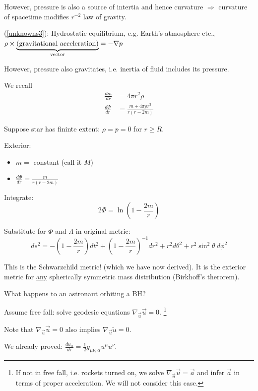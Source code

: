 \documentclass[a4paper]{article} %
\renewcommand{\tilde}{\widetilde}
\begin{document}
However, pressure is also a source of intertia and hence curvature $\Rightarrow$ curvature of spacetime modifies $r^{-2}$ law of gravity.

\HRule

(\ref{unknowns3}): Hydrostatic equilibrium, e.g. Earth's atmosphere etc., $\rho\times\underbrace{\text{(gravitational acceleration)}}_{\mathclap{\text{vector}}}=-\nabla p$

However, pressure also gravitates, i.e. inertia of fluid includes its pressure.

\HRule

We recall 
\begin{align}
\frac{dm}{dr}&=4\pi r^2 \rho\\
\frac{d\Phi}{dr}&=\frac{m+4\pi \rho r^3}{r(r-2m)}
\end{align}

Suppose star has fininte extent: $\rho=p=0$ for $r\geq R$.

Exterior: 
\begin{itemize}
\item $m=$ constant (call it $M$)
\item $\frac{d\Phi}{dr}=\frac{m}{r(r-2m)}$
\end{itemize}

Integrate:
\begin{equation}
2\Phi=\ln \left(1-\frac{2m}{r}\right)
\end{equation}

Substitute for $\Phi$ and $\Lambda$ in original metric:
\begin{equation}
ds^2=-\left(1-\frac{2m}{r}\right)dt^2+\left(1-\frac{2m}{r}\right)^{-1}dr^2 + r^2 d\theta^2
+r^2\sin^2 \theta~d\phi^2
\end{equation}

This is the Schwarzchild metric! (which we have now derived). It is the exterior metric for \underline{any} spherically symmetric mass distribution (Birkhoff's therorem).

What happens to an astronaut orbiting a BH?

Assume free fall: solve geodesic equations $\nabla_{\vec{u}}\vec{u}=0$. \footnote{If not in free fall, i.e. rockets turned on, we solve $\nabla_{\vec{u}}\vec{u}=\vec{a}$ and infer $\vec{a}$ in terms of proper acceleration. We will not consider this case.}

Note that  $\nabla_{\vec{u}}\vec{u}=0$ also implies $\nabla_{\vec{u}}\tilde{u}=0$.

We already proved: $\frac{du_{\alpha}}{d\tau}=\frac{1}{2}g_{\mu\nu,\alpha}u^{\mu} u^{\nu}$.
\end{document}
